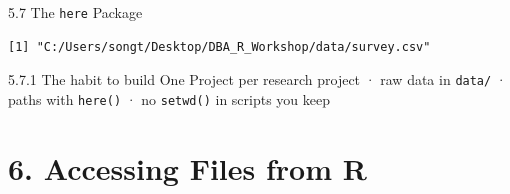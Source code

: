 \documentclass[
  ignorenonframetext,
  aspectratio=169,
]{beamer}
\begin{document}
\begin{frame}[fragile]{5.7 The \texttt{here} Package}
\begingroup\tiny\color{darkgray}

\begin{verbatim}
[1] "C:/Users/songt/Desktop/DBA_R_Workshop/data/survey.csv"
\end{verbatim}

\endgroup

\begin{exampleblock}{5.7.1 The habit to build}
\protect{}\label{the-habit-to-build}
One Project per research project · raw data in \texttt{data/} · paths
with \texttt{here()} · no \texttt{setwd()} in scripts you keep
\end{exampleblock}
\end{frame}

\section{6. Accessing Files from R}\label{sec-files}
\end{document}
